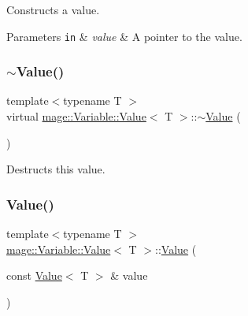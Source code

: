 Constructs a value.


\begin{DoxyParams}[1]{Parameters}
\mbox{\tt in}  & {\em value} & A pointer to the value. \\
\hline
\end{DoxyParams}
\hypertarget{structmage_1_1_variable_1_1_value_ab0b88d59c1049b89557fbaf649a3b459}{}\label{structmage_1_1_variable_1_1_value_ab0b88d59c1049b89557fbaf649a3b459} 
\subsubsection{\texorpdfstring{$\sim$\+Value()}{~Value()}}
{\footnotesize\ttfamily template$<$typename T $>$ \\
virtual \hyperlink{structmage_1_1_variable_1_1_value}{mage\+::\+Variable\+::\+Value}$<$ T $>$\+::$\sim$\hyperlink{structmage_1_1_variable_1_1_value}{Value} (\begin{DoxyParamCaption}{ }\end{DoxyParamCaption})\hspace{0.3cm}{\ttfamily [virtual]}}

Destructs this value. \hypertarget{structmage_1_1_variable_1_1_value_a083583e9c9c59eae659db2bfdf4b6629}{}\label{structmage_1_1_variable_1_1_value_a083583e9c9c59eae659db2bfdf4b6629} 
\subsubsection{\texorpdfstring{Value()}{Value()}\hspace{0.1cm}{\footnotesize\ttfamily [2/3]}}
{\footnotesize\ttfamily template$<$typename T $>$ \\
\hyperlink{structmage_1_1_variable_1_1_value}{mage\+::\+Variable\+::\+Value}$<$ T $>$\+::\hyperlink{structmage_1_1_variable_1_1_value}{Value} (\begin{DoxyParamCaption}\item[{const \hyperlink{structmage_1_1_variable_1_1_value}{Value}$<$ T $>$ \&}]{value }\end{DoxyParamCaption})\hspace{0.3cm}{\ttfamily [private]}}

